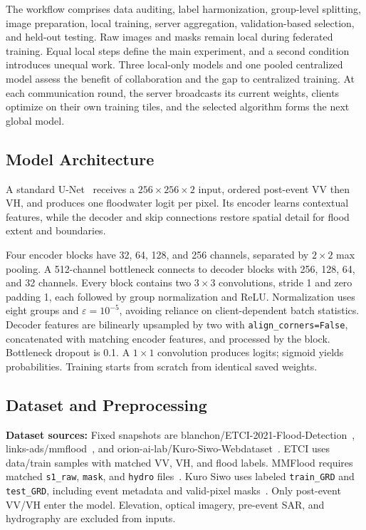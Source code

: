 \documentclass[conference]{IEEEtran}
\begin{document}
The workflow comprises data auditing, label harmonization, group-level splitting, image preparation, local training, server aggregation, validation-based selection, and held-out testing. Raw images and masks remain local during federated training. Equal local steps define the main experiment, and a second condition introduces unequal work. Three local-only models and one pooled centralized model assess the benefit of collaboration and the gap to centralized training. At each communication round, the server broadcasts its current weights, clients optimize on their own training tiles, and the selected algorithm forms the next global model.

\subsection{Model Architecture}
A standard U-Net~\cite{ronneberger2015u} receives a $256 \times 256 \times 2$ input, ordered post-event VV then VH, and produces one floodwater logit per pixel. Its encoder learns contextual features, while the decoder and skip connections restore spatial detail for flood extent and boundaries.

Four encoder blocks have 32, 64, 128, and 256 channels, separated by $2 \times 2$ max pooling. A 512-channel bottleneck connects to decoder blocks with 256, 128, 64, and 32 channels. Every block contains two $3 \times 3$ convolutions, stride 1 and zero padding 1, each followed by group normalization and ReLU. Normalization uses eight groups and $\varepsilon = 10^{-5}$, avoiding reliance on client-dependent batch statistics. Decoder features are bilinearly upsampled by two with \texttt{align\_corners=False}, concatenated with matching encoder features, and processed by the block. Bottleneck dropout is 0.1. A $1 \times 1$ convolution produces logits; sigmoid yields probabilities. Training starts from scratch from identical saved weights.

\subsection{Dataset and Preprocessing}
\textbf{Dataset sources:} Fixed snapshots are blanchon/ETCI-2021-Flood-Detection~\cite{etci_hf}, links-ads/mmflood~\cite{mmflood_hf}, and orion-ai-lab/Kuro-Siwo-Webdataset~\cite{kuro_hf}. ETCI uses data/train samples with matched VV, VH, and flood labels. MMFlood requires matched \texttt{s1\_raw}, \texttt{mask}, and \texttt{hydro} files~\cite{mmflood_zenodo}. Kuro Siwo uses labeled \texttt{train\_GRD} and \texttt{test\_GRD}, including event metadata and valid-pixel masks~\cite{bountos2024kuro}. Only post-event VV/VH enter the model. Elevation, optical imagery, pre-event SAR, and hydrography are excluded from inputs.
\end{document}
